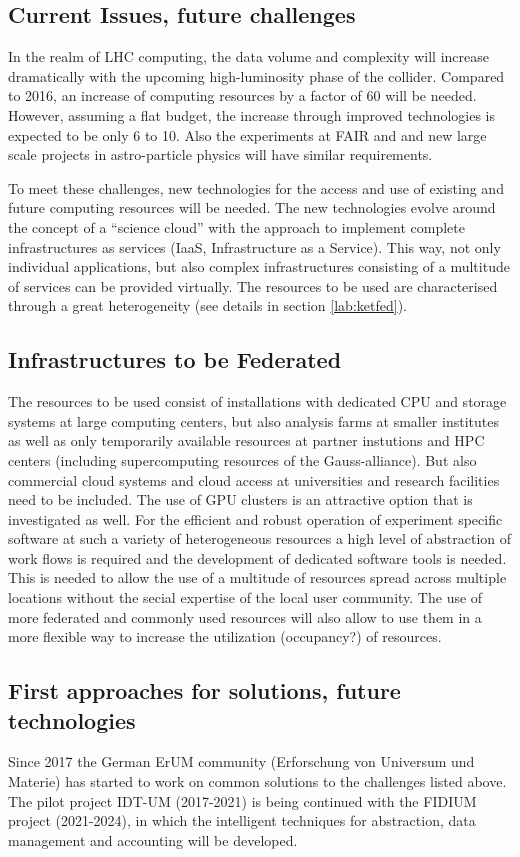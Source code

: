 \subsection{Current Issues, future challenges}
In the realm of LHC computing, the data volume and complexity will
increase dramatically with the upcoming high-luminosity phase of the
collider. Compared to 2016, an increase of computing resources by a
factor of 60 will be needed. However, assuming a flat budget, the
increase through improved technologies is expected to be only 6 to 10. Also the
experiments at FAIR and and new large scale projects in astro-particle
physics will have similar requirements. 

To meet these challenges, new technologies for the access and use of
existing and future computing resources will be needed. The new
technologies evolve around the concept of a ``science cloud'' with the
approach to implement complete infrastructures as services (IaaS,
Infrastructure as a Service). This way, not only individual
applications, but also complex infrastructures consisting of a
multitude of services can be provided virtually. The resources to be
used are characterised through a great heterogeneity (see details in section
\ref{lab:ketfed}). 

\subsection{Infrastructures to be Federated \label{lab:ketfed} }
The resources to be used consist of installations with dedicated CPU
and storage systems at large computing centers, but also analysis
farms at smaller institutes as well as only temporarily available
resources at partner instutions and HPC centers (including
supercomputing resources of the Gauss-alliance). But also commercial
cloud systems and cloud access at universities and research facilities
need to be included. The use of GPU clusters is an attractive option
that is investigated as well. For the efficient and robust operation
of experiment specific software at such a variety of heterogeneous
resources a high level of abstraction of work flows is required and
the development of dedicated software tools is needed. This is needed
to allow the use of a multitude of resources spread across multiple
locations without the secial expertise of the local user
community. The use of more federated and commonly used resources will
also allow to use them in a more flexible way to increase the
utilization (occupancy?) of resources. 

\subsection{First approaches for solutions, future technologies}
Since 2017 the German ErUM community (Erforschung von Universum und
Materie) has started to work on common solutions to the challenges
listed above. The pilot project IDT-UM (2017-2021) is being continued
with the FIDIUM project (2021-2024), in which the intelligent
techniques for abstraction, data management and accounting will be
developed.

